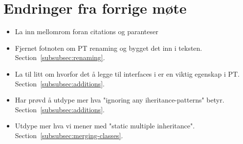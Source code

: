 
\chapter*{Endringer fra forrige møte}

\begin{itemize}
    \item La inn mellomrom foran citations og paranteser
    \item Fjernet fotnoten om PT renaming og bygget det inn i teksten.
    Section~\vref{subsubsec:renaming}.
    \item La til litt om hvorfor det å legge til interfaces i  er en viktig egenskap i PT.
    Section~\vref{subsubsec:additions}.
    \item Har prøvd å utdype mer hva "ignoring any iheritance-patterns" betyr.
    Section~\vref{subsubsec:additions}.
    \item Utdype mer hva vi mener med "static multiple inheritance".
    Section~\vref{subsubsec:merging-classes}.
\end{itemize}

